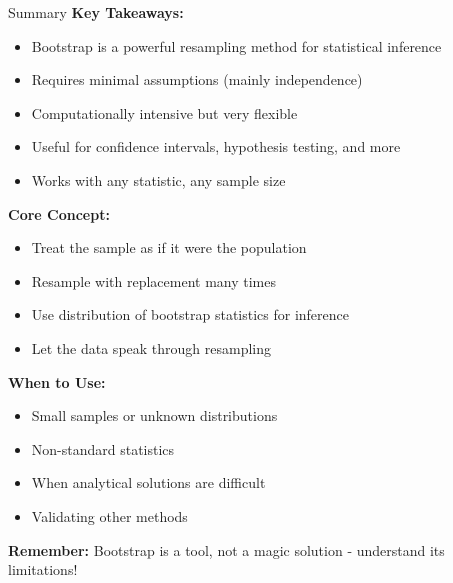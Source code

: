 \documentclass[aspectratio=169]{beamer}
\begin{document}
\begin{frame}{Summary}
\scriptsize
\textbf{Key Takeaways:}
\begin{itemize}
    \item Bootstrap is a powerful resampling method for statistical inference
    \item Requires minimal assumptions (mainly independence)
    \item Computationally intensive but very flexible
    \item Useful for confidence intervals, hypothesis testing, and more
    \item Works with any statistic, any sample size
\end{itemize}

\vspace{0.05cm}
\textbf{Core Concept:}
\begin{itemize}
    \item Treat the sample as if it were the population
    \item Resample with replacement many times
    \item Use distribution of bootstrap statistics for inference
    \item Let the data speak through resampling
\end{itemize}

\vspace{0.05cm}
\textbf{When to Use:}
\begin{itemize}
    \item Small samples or unknown distributions
    \item Non-standard statistics
    \item When analytical solutions are difficult
    \item Validating other methods
\end{itemize}

\vspace{0.05cm}
\textbf{Remember:} Bootstrap is a tool, not a magic solution - understand its limitations!
\end{frame}
\end{document}
